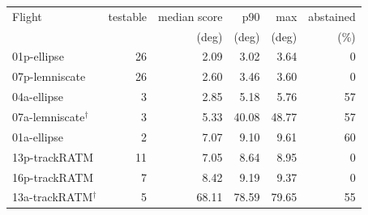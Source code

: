 \footnotesize
\begin{tabular}{lrrrrr}
\toprule
Flight & testable & median score & p90 & max & abstained \\
 & & (deg) & (deg) & (deg) & (\%) \\
\midrule
01p-ellipse & 26 & 2.09 & 3.02 & 3.64 & 0 \\
07p-lemniscate & 26 & 2.60 & 3.46 & 3.60 & 0 \\
04a-ellipse & 3 & 2.85 & 5.18 & 5.76 & 57 \\
07a-lemniscate$^\dagger$ & 3 & 5.33 & 40.08 & 48.77 & 57 \\
01a-ellipse & 2 & 7.07 & 9.10 & 9.61 & 60 \\
13p-trackRATM & 11 & 7.05 & 8.64 & 8.95 & 0 \\
16p-trackRATM & 7 & 8.42 & 9.19 & 9.37 & 0 \\
13a-trackRATM$^\dagger$ & 5 & 68.11 & 78.59 & 79.65 & 55 \\
\bottomrule
\end{tabular}
